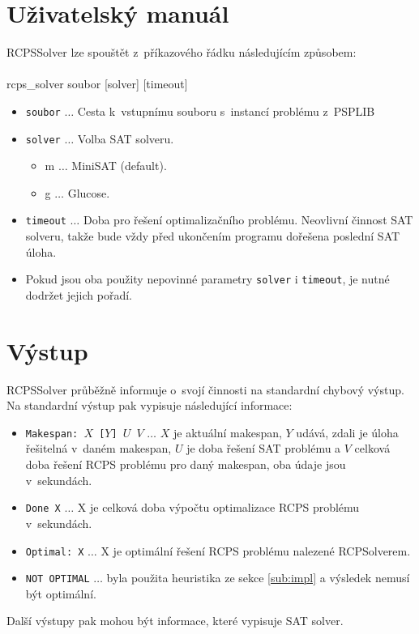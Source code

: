 \documentclass[a4paper, 12pt]{article}
\begin{document}
\section{Uživatelský manuál}
\label{app:help}
RCPSSolver lze spouštět z~příkazového řádku následujícím způsobem:
\\
\\
  rcps\_solver soubor [solver] [timeout]
  \begin{itemize}
    \item \texttt{soubor} $\ldots$ Cesta k~vstupnímu souboru s~instancí problému z~PSPLIB
    \item \texttt{solver} $\ldots$ Volba SAT solveru.  
    \begin{itemize}
        \item m $\ldots$ MiniSAT (default).
        \item g $\ldots$ Glucose.
    \end{itemize}
    \item \texttt{timeout} $\ldots$ Doba pro řešení optimalizačního problému.
    Neovlivní činnost SAT solveru, takže bude vždy před ukončením programu dořešena poslední SAT úloha.
    \item Pokud jsou oba použity nepovinné parametry \texttt{solver} i \texttt{timeout}, je nutné dodržet jejich pořadí.
  \end{itemize}

\section{Výstup}
\label{app:output}
RCPSSolver průběžně informuje o~svojí činnosti na standardní chybový výstup.
Na standardní výstup pak vypisuje následující informace:
\begin{itemize}
    \item \texttt{Makespan: $X$ [$Y$] $U$ $V$} $\ldots$ $X$ je aktuální makespan, $Y$ udává, zdali je úloha řešitelná v~daném makespan,
    $U$ je doba řešení SAT problému a $V$ celková doba řešení RCPS problému pro daný makespan, oba údaje jsou v~sekundách.
    \item \texttt{Done X} $\ldots$ X je celková doba výpočtu optimalizace RCPS problému v~sekundách.
    \item \texttt{Optimal: X} $\ldots$ X je optimální řešení RCPS problému nalezené RCPSolverem.
    \item \texttt{NOT OPTIMAL} $\ldots$ byla použita heuristika ze sekce \ref{sub:impl} a výsledek nemusí být optimální.
\end{itemize}
Další výstupy pak mohou být informace, které vypisuje SAT solver.

\newpage


\end{document}

